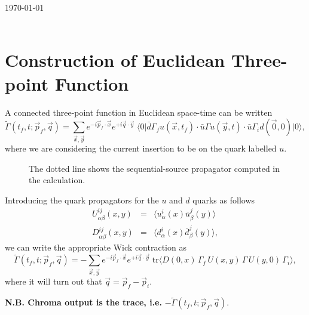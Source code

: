 \documentclass[12pt]{article}
\newcommand{\pfdotx}{\vec{p}_f \cdot \vec{x}}
\begin{document}
\hfill \today\\[1.0ex]
\\[1.0ex]

\section{Construction of Euclidean Three-point Function}

A connected three-point function in Euclidean space-time can be written
\begin{equation}
\tilde{\Gamma}(t_f, t; \vec{p}_f, \vec{q}) = \sum_{\vec{x},
\vec{y}} e^{-i\pfdotx}
e^{+i\vec{q}\cdot\vec{y}} \; \Big\langle 0 \Big| \bar{d}\Gamma_f u(\vec{x}, t_f) \cdot \bar{u} \Gamma u(\vec{y}, t) \cdot \bar{u} \Gamma_i d(\vec{0}, 0) \Big| 0 \Big\rangle ,
\end{equation}
where we are considering the current insertion to be on the quark labelled
$u$.
\vspace{-4cm}
\begin{figure}[!h]
\begin{center}
\caption{The dotted line shows the sequential-source
  propagator computed in the calculation.}
\end{center}
\end{figure}

Introducing the quark propagators for the $u$ and $d$ quarks as
follows
\begin{eqnarray}
U^{ij}_{\alpha\beta} (x,y) & = & \langle u^i_{\alpha}(x)
\bar{u}^j_{\beta}(y)\rangle\\
D^{ij}_{\alpha\beta} (x,y) & = & \langle d^i_{\alpha}(x)
\bar{d}^j_{\beta}(y)\rangle,
\end{eqnarray}
we can write the appropriate Wick contraction as
\begin{equation} \label{eq:u_quark_3pt}
\tilde{\Gamma}(t_f, t; \vec{p}_f, \vec{q}) = - \sum_{\vec{x},
\vec{y}} e^{-i\pfdotx}
e^{+i\vec{q}\cdot\vec{y}} \;   \mathrm{tr} \Big\langle D(0,x)\, \Gamma_f\, U(x,y)\, \Gamma\, U(y,0)\, \Gamma_i  \Big\rangle ,
\end{equation}
where it will turn out that $\vec{q}=\vec{p}_f - \vec{p}_i$.

{\bf N.B. Chroma output is the trace, i.e.} $- \tilde{\Gamma}(t_f, t; \vec{p}_f, \vec{q})$.
\end{document}
